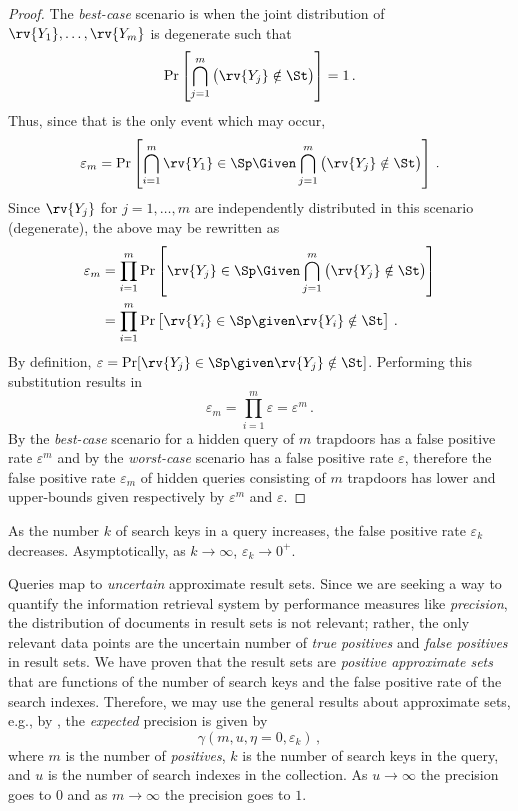 \documentclass[ ../main.tex]{subfiles}
\begin{document}
\begin{proof}
The \emph{best-case} scenario is when the joint distribution of $\rv{Y_1}, \ldots, \rv{Y_m}$ is degenerate such that
\begin{equation}
    \Pr\left[\bigcap_{j=1}^{m} \left(\rv{Y_j} \notin \St\right)\right] = 1\,.
\end{equation}
Thus, since that is the only event which may occur,
\begin{equation}
    \varepsilon_m =
        \Pr\left[\bigcap_{i=1}^{m} \rv{Y_1} \in \Sp \Given \bigcap_{j=1}^{m} \left(\rv{Y_j} \notin \St\right)\right]\,.
\end{equation}
Since $\rv{Y_j}$ for $j=1,\ldots,m$ are independently distributed in this scenario (degenerate), the above may be rewritten as
\begin{align}
    \varepsilon_m
        &= \prod_{i=1}^{m} \Pr\left[\rv{Y_j} \in \Sp \Given \bigcap_{j=1}^{m} \left(\rv{Y_j} \notin \St\right)\right]\\
        &= \prod_{i=1}^{m} \Pr\left[\rv{Y_i} \in \Sp \given \rv{Y_i} \notin \St\right]\,.
\end{align}
By definition, $\varepsilon = \Pr[\rv{Y_j} \in \Sp \given \rv{Y_j} \notin \St]$. Performing this substitution results in
\begin{equation}
\label{eq:proof_fprate_hq_ub}
    \varepsilon_m = \prod_{i=1}^{m} \varepsilon = \varepsilon^m\,.
\end{equation}
By  the \emph{best-case} scenario for a hidden query of $m$ trapdoors has a false positive rate $\varepsilon^m$ and by  the \emph{worst-case} scenario has a false positive rate $\varepsilon$, therefore the false positive rate $\varepsilon_m$ of hidden queries consisting of $m$ trapdoors has lower and upper-bounds given respectively by $\varepsilon^m$ and $\varepsilon$.
\end{proof}
\begin{corollary}
As the number $k$ of search keys in a query increases, the false positive rate $\varepsilon_k$ decreases. Asymptotically, as $k \to \infty$, $\varepsilon_k \to 0^+$.
\end{corollary}

Queries map to \emph{uncertain} approximate result sets. Since we are seeking a way to quantify the information retrieval system by performance measures like \emph{precision}, the distribution of documents in result sets is not relevant; rather, the only relevant data points are the uncertain number of \emph{true positives} and \emph{false positives} in result sets. We have proven that the result sets are \emph{positive approximate sets} that are functions of the number of search keys and the false positive rate of the search indexes. Therefore, we may use the general results about approximate sets, e.g., by \Cref{}, the \emph{expected} precision is given by
\begin{equation}
    \gamma(m, u, \eta=0, \varepsilon_k)\,,
\end{equation}
where $m$ is the number of \emph{positives}, $k$ is the number of search keys in the query, and $u$ is the number of search indexes in the collection. As $u \to \infty$ the precision goes to $0$ and as $m \to \infty$ the precision goes to $1$.
\end{document}
